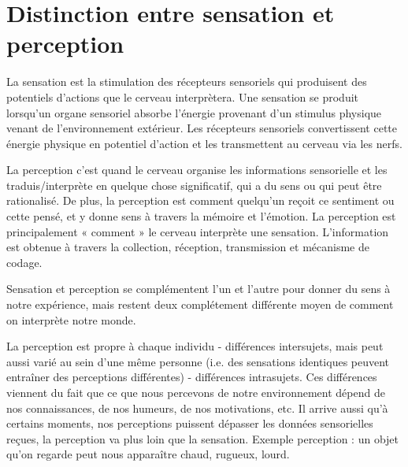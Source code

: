 \section{Distinction entre sensation et perception}
La sensation est la stimulation des récepteurs sensoriels qui produisent des potentiels d’actions que le cerveau interprètera. Une sensation se produit lorsqu’un organe sensoriel absorbe l’énergie provenant d’un stimulus physique venant de l’environnement extérieur. Les récepteurs sensoriels convertissent cette énergie physique en  potentiel d’action et les transmettent au cerveau via les nerfs.\par
La perception c’est quand le cerveau organise les informations sensorielle et les traduis/interprète en quelque chose significatif, qui a du sens ou qui peut être rationalisé. De plus, la perception est comment quelqu’un reçoit ce sentiment ou cette pensé, et y donne sens à travers la mémoire et l’émotion. La perception est principalement « comment » le cerveau interprète une sensation. L’information est obtenue à travers la collection, réception, transmission et mécanisme de codage.\par
Sensation et perception se complémentent l’un et l’autre pour donner du sens à notre expérience, mais restent deux complétement différente moyen de comment on interprète notre monde.\par
La perception est propre à chaque individu - différences intersujets, mais peut aussi varié au sein d’une même personne (i.e. des sensations identiques peuvent entraîner des perceptions différentes) - différences intrasujets. Ces différences viennent du fait que ce que nous percevons de notre environnement dépend de nos connaissances, de nos humeurs, de nos motivations, etc. Il arrive aussi qu’à certains moments, nos perceptions puissent dépasser les données sensorielles reçues, la perception va plus loin que la sensation. Exemple perception : un objet qu’on regarde peut nous apparaître chaud, rugueux, lourd.\par


